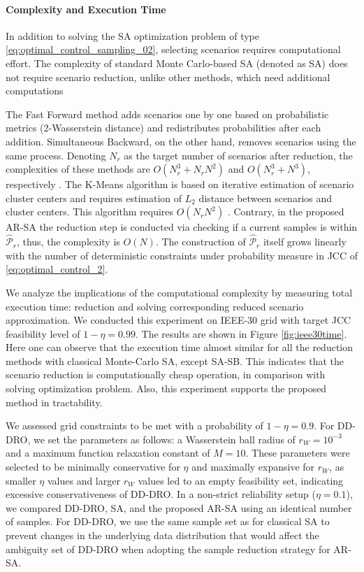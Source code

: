 \paragraph{Complexity and Execution Time}
In addition to solving the SA optimization problem of type \eqref{eq:optimal_control_sampling_02}, selecting scenarios requires computational effort. The complexity of standard Monte Carlo-based SA (denoted as SA) does not require scenario reduction, unlike other methods, which need additional computations

The Fast Forward method adds scenarios one by one based on probabilistic metrics (2-Wasserstein distance) and redistributes probabilities after each addition. Simultaneous Backward, on the other hand, removes scenarios using the same process. Denoting $N_r$ as the target number of scenarios after reduction, the complexities of these methods are $O(N_r^3 + N_r N^2)$ and $O(N_r^3 + N^3)$, respectively \cite{heitsch2003scenario, rujeerapaiboon2022scenario}. The K-Means algorithm is based on iterative estimation of scenario cluster centers and requires estimation of $L_2$ distance between scenarios and cluster centers. This algorithm requires $O(N_rN^2)$ \cite{pakhira2014linear}. Contrary, in the proposed AR-SA the reduction step is conducted via checking if a current samples is within $\hat{\mathcal{P}}_r$, thus, the complexity is $O(N)$. The construction of $\hat{\mathcal{P}}_r$ itself grows linearly with the number of deterministic constraints under probability measure in JCC of \eqref{eq:optimal_control_2}. 

We analyze the implications of the computational complexity by measuring total execution time: reduction and solving corresponding reduced scenario approximation. We conducted this experiment on IEEE-30 grid with target JCC feasibility level of $1-\eta=0.99$. The results are shown in Figure \ref{fig:ieee30time}. Here one can observe that the execution time almost similar for all the reduction methods with classical Monte-Carlo SA, except SA-SB. This indicates that the scenario reduction is computationally cheap operation, in comparison with solving optimization problem. Also, this experiment supports the proposed method in tractability.


We assessed grid constraints to be met with a probability of $1-\eta = 0.9$. For DD-DRO, we set the parameters as follows: a Wasserstein ball radius of $r_W = 10^{-3}$ and a maximum function relaxation constant of $M = 10$. These parameters were selected to be minimally conservative for $\eta$ and maximally expansive for $r_W$, as smaller $\eta$ values and larger $r_W$ values led to an empty feasibility set, indicating excessive conservativeness of DD-DRO. In a non-strict reliability setup ($\eta=0.1$), we compared DD-DRO, SA, and the proposed AR-SA using an identical number of samples. For DD-DRO, we use the same sample set as for classical SA to prevent changes in the underlying data distribution that would affect the ambiguity set of DD-DRO when adopting the sample reduction strategy for AR-SA.

